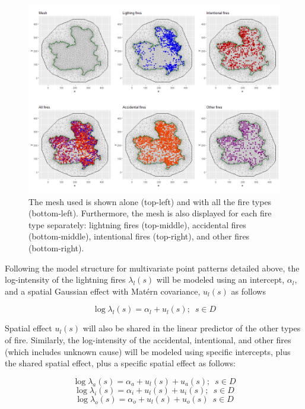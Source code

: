 \begin{figure}[h!]
\begin{center}
\includegraphics[scale=0.40]{images/clmfires_mesh.png}
\end{center}
\caption{The mesh used is shown alone (top-left) and with all the fire types (bottom-left). Furthermore, the mesh is also displayed for each fire type separately: lightning fires (top-middle), accidental fires (bottom-middle), intentional fires (top-right), and other fires (bottom-right).}
\label{fig:clmfires:data}
\end{figure}	 


Following the model structure for multivariate point patterns detailed above, the log-intensity of the lightning fires $\lambda_l(s)$ will be modeled using an intercept, $\alpha_l$, and a spatial Gaussian effect with Mat\'ern covariance, $u_l(s)$ as follows 

$$\log{\lambda_l(s)}= \alpha_l + u_l(s); \,\,\, s\in D$$  

Spatial effect $u_l(s)$ will also be shared in the linear predictor of the other types of fire. Similarly, the log-intensity of the accidental, intentional, and other fires (which includes unknown cause) will be modeled using specific intercepts, plus the shared spatial effect, plus a specific spatial effect as follows: 

$$\log{\lambda_a(s)}= \alpha_a + u_l(s) + u_a(s); \,\,\, s\in D $$ 
$$\log{\lambda_i(s)}= \alpha_i + u_l(s) + u_i(s); \,\,\, s\in D $$  
$$\log{\lambda_o(s)}= \alpha_o + u_l(s) + u_o(s) \,\,\, s\in D $$  
 
